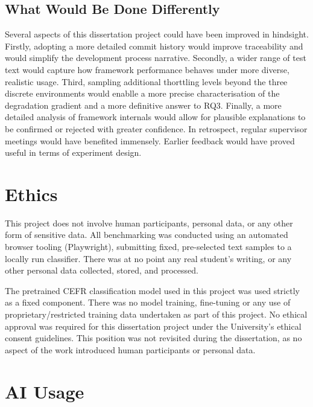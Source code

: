 \documentclass[11pt,a4paper]{report}
\begin{document}
\section{What Would Be Done Differently}

Several aspects of this dissertation project could have been improved in hindsight. Firstly, adopting a more detailed commit history would improve traceability and would simplify the development process narrative. Secondly, a wider range of test text would capture how framework performance behaves under more diverse, realistic usage. Third, sampling additional thorttling levels beyond the three discrete environments would enablle a more precise characterisation of the degradation gradient and a more definitive answer to RQ3. Finally, a more detailed analysis of framework internals would allow for plausible explanations to be confirmed or rejected with greater confidence.
In retrospect, regular supervisor meetings would have benefited immensely. Earlier feedback would have proved useful in terms of experiment design.
\chapter{Ethics}
\label{ch:ethics}

This project does not involve human participants, personal data, or any other form of sensitive data. All benchmarking was conducted using an automated browser tooling (Playwright), submitting fixed, pre-selected text samples to a locally run classifier. There was at no point any real student's writing, or any other personal data collected, stored, and processed.

\vspace{5mm}

The pretrained CEFR classification model used in this project was used strictly as a fixed component. There was no model training, fine-tuning or any use of proprietary/restricted training data undertaken as part of this project. No ethical approval was required for this dissertation project under the University's ethical consent guidelines. This position was not revisited during the dissertation, as  no aspect of the work introduced human participants or personal data. 


\chapter{AI Usage}
\label{ch:ai-usage}
\end{document}
